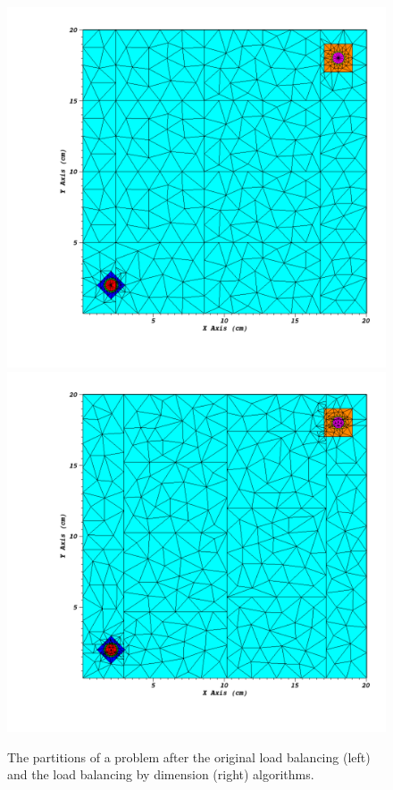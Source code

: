 {\begin{figure}[H]
\centering
\includegraphics[scale=0.45,trim={0.95in 0.64in 0.35in 0.44in},clip]{Figures/og_lb_example.pdf}
\includegraphics[scale=0.45,trim={0.95in 0.64in 0.35in 0.44in},clip]{Figures/lbd_example.pdf}
\caption{The partitions of a problem after the original load balancing (left) and the load balancing by dimension (right) algorithms.}
\label{alg_illustration}
\end{figure}


}
